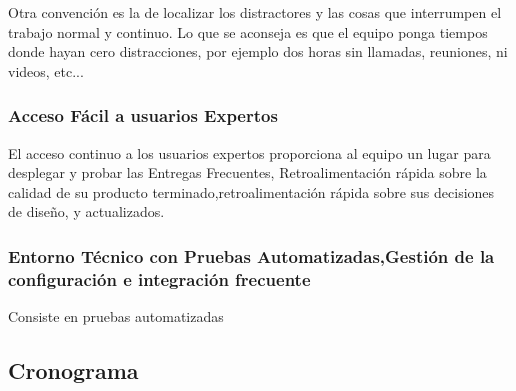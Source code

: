 Otra convención es la de localizar los distractores y las cosas que interrumpen el trabajo normal y continuo. Lo que se aconseja es que el equipo ponga tiempos donde hayan cero distracciones, por ejemplo dos horas sin llamadas, reuniones, ni videos, etc...\\

\subsubsection{Acceso Fácil a usuarios Expertos}
El acceso continuo a los usuarios expertos proporciona al equipo un lugar para desplegar y probar las Entregas Frecuentes,
Retroalimentación rápida sobre la calidad de su producto terminado,retroalimentación rápida sobre sus decisiones de diseño, y
actualizados.\cite{cockburn2004crystal}

\subsubsection{Entorno Técnico con Pruebas Automatizadas,Gestión de la configuración e integración frecuente}

Consiste en pruebas automatizadas
\subsection{Cronograma}



